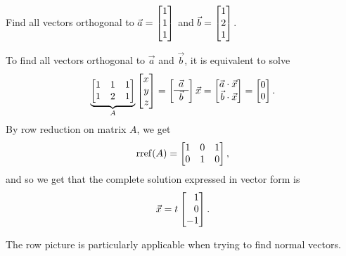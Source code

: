 \begin{example}
	Find all vectors orthogonal to $\vec a=\mat{1\\1\\1}$ and $\vec b=\mat{1\\2\\1}$.

	To find all vectors orthogonal to $\vec a$ and $\vec b$, it is equivalent to solve
	\[
	\underbrace{\mat{1&1&1\\1&2&1}}_A\mat{x\\y\\z}=
	\left[\begin{array}{c}\vec a\\\hline\vec b\end{array}\right]\vec x=
	\mat{\vec a\cdot \vec x\\\vec b\cdot\vec x}
	     =\mat{0\\0}.
    \]
    By row reduction on matrix $A$, we get
    \[
        \Rref(A) = \mat{1&0&1\\0&1&0},
    \]
    and so we get that the complete solution expressed in vector form is
    \[
        \vec x = t\mat{1\\0\\-1}.
	\]
\end{example}

The row picture is particularly applicable when trying to find normal vectors.

